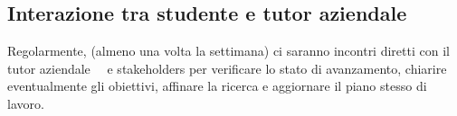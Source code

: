 \subsection{Interazione tra studente e tutor aziendale}

Regolarmente, (almeno una volta la settimana) ci saranno incontri diretti con il tutor aziendale \nomeTutorAziendale\ \cognomeTutorAziendale\ e stakeholders per verificare lo stato di avanzamento, chiarire eventualmente gli obiettivi, affinare la ricerca e aggiornare il piano stesso di lavoro.
